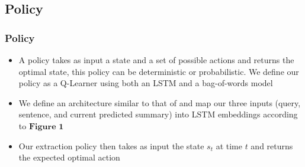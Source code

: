 \documentclass[]{beamer}
\begin{document}
	\subsection{Policy}
	\begin{frame}
			\frametitle{Policy}
			\begin{itemize}
				\item<1-> A policy takes as input a state and a set of possible actions and returns the optimal state, this policy can be deterministic or probabilistic. We define our policy as a Q-Learner using both an LSTM and a bag-of-words model
				\item<1-> We define an architecture similar to that of \cite{narasimhan2015language} and map our three inputs (query, sentence, and current predicted summary) into LSTM embeddings according to $\textbf{Figure 1}$
				\item<1-> Our extraction policy then takes as input the state $s_t$ at time $t$ and returns the expected optimal action
			\end{itemize}
	\end{frame}
\end{document}
